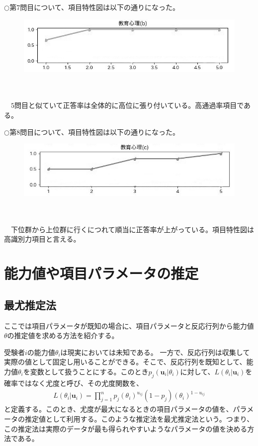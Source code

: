 \documentclass[12pt]{jarticle}
\numberwithin{equation}{subsection}
\begin{document}
$\bigcirc$第$7$問目について、項目特性図は以下の通りになった。
\vspace{1.5cm}
\begin{figure}[H]
  \includegraphics[bb = -50 60 1 1,scale = 0.6]{Figure_7.jpg}
\end{figure}
\leavevmode \\
\\
\ \ $5$問目と似ていて正答率は全体的に高位に張り付いている。高通過率項目である。
\newpage

$\bigcirc$第$8$問目について、項目特性図は以下の通りになった。
\vspace{1.5cm}
\begin{figure}[H]
  \includegraphics[bb = -50 60 1 1,scale = 0.6]{Figure_8.jpg}
\end{figure}
\leavevmode \\
\\
\ \ 下位群から上位群に行くにつれて順当に正答率が上がっている。項目特性図は高識別力項目と言える。
\\

\section{能力値や項目パラメータの推定}
\subsection{最尤推定法}
ここでは項目パラメータが既知の場合に、項目パラメータと反応行列から能力値$\theta$の推定値を求める方法を紹介する。

受験者$i$の能力値$\theta_i$は現実においては未知である。
一方で、反応行列は収集して実際の値として固定し用いることができる。そこで、反応行列を既知として、能力値$\theta_i$を変数として扱うことにする。このとき$p_j(\boldsymbol{u}_i | \theta_i)$に対して、$L(\theta_i|\boldsymbol{u}_{i})$を確率ではなく尤度と呼び、その尤度関数を、
\begin{align}
  \label{01}
  \displaystyle L(\theta_i|\boldsymbol{u}_{i}) =\prod_{j = 1}^{n} p_{j}(\theta_i)^{u_{ij}} (1 - p_{j})(\theta_i)^{1 - u_{ij}}
\end{align}
と定義する。このとき、尤度が最大になるときの項目パラメータの値を、パラメータの推定値として利用する。このような推定法を最尤推定法という。つまり、この推定法は実際のデータが最も得られやすいようなパラメータの値を決める方法である。
\end{document}
